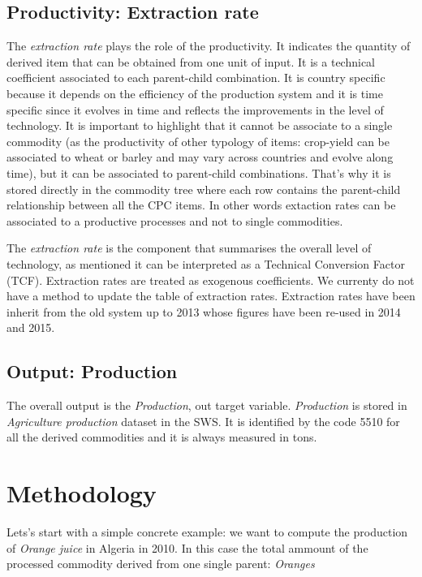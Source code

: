 \documentclass[nojss]{jss}
\begin{document}
\subsection{ Productivity: Extraction rate}
The \textit{extraction rate} plays the role of the productivity.
It indicates the quantity of derived item that can be obtained from one unit of input. It is a technical coefficient associated to each parent-child combination. It is country specific because it depends on the efficiency of the production system and it is   time specific since it evolves in time and reflects the improvements in the level of technology.  It is important to highlight that it cannot be associate to a single commodity (as the productivity of other typology of items: crop-yield can be associated to wheat or barley and may vary across countries and evolve along time), but it can be associated to parent-child combinations. That's why it is stored directly in the commodity tree where each row contains the parent-child relationship between all the CPC items. In other words extaction rates can be associated to a productive processes and not to single commodities.

The \textit{extraction rate} is the component that summarises the overall level of technology, as mentioned it can be interpreted as a Technical Conversion Factor (TCF). Extraction rates are treated as exogenous coefficients. We currenty do not have a method to update the table of extraction rates. Extraction rates have been inherit from the old system up to 2013 whose figures have been re-used in 2014 and 2015.



\subsection{ Output: Production}
The overall output is the \textit{Production}, out target variable. \textit{Production} is stored in \textit{Agriculture production} dataset in the SWS. It is identified by the code 5510 for all the derived commodities and it is always measured in tons.


  \section{Methodology}
  
  Lets's start with a simple concrete example: we want to compute the production of \textit{Orange juice} in Algeria in 2010. In this case   the total ammount of the processed commodity derived from one single parent: \textit{Oranges}
  
\end{document}
